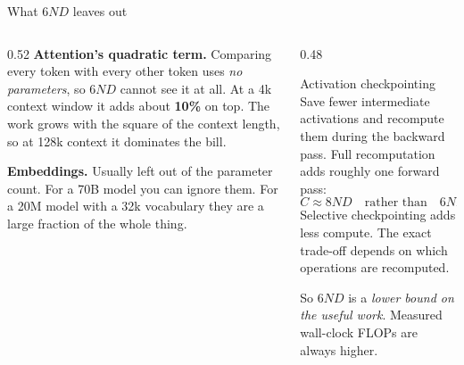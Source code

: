 \documentclass[aspectratio=169,10pt]{beamer}
\begin{document}
\begin{frame}{What $6ND$ leaves out}
  \begin{columns}[T]
    \begin{column}{0.52\textwidth}
      \textbf{Attention's quadratic term.} Comparing every token with every
      other token uses \emph{no parameters}, so $6ND$ cannot see it at all. At a
      4k context window it adds about \textbf{10\%} on top. The work grows with
      the square of the context length, so at 128k context it dominates the bill.
      \vspace{0.5em}

      \textbf{Embeddings.} Usually left out of the parameter count. For a 70B
      model you can ignore them. For a 20M model with a 32k vocabulary they are
      a large fraction of the whole thing.
    \end{column}
    \begin{column}{0.48\textwidth}
      \begin{block}{Activation checkpointing}
        \small
        Save fewer intermediate activations and recompute them during the
        backward pass. Full recomputation adds roughly one forward pass:
        \[ C \approx 8ND \quad \text{rather than} \quad 6ND \]
        Selective checkpointing adds less compute. The exact trade-off depends
        on which operations are recomputed.
      \end{block}
      \vspace{0.3em}
      \small
      So $6ND$ is a \emph{lower bound on the useful work}. Measured wall-clock
      FLOPs are always higher.
    \end{column}
  \end{columns}
\end{frame}
\end{document}
